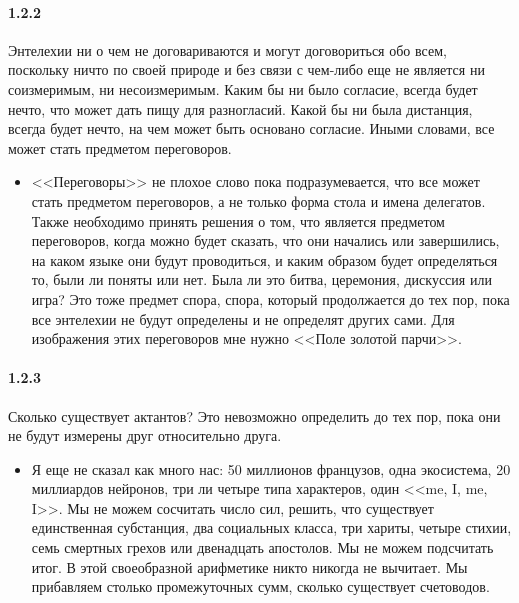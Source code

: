 
\paragraph{1.2.2}\hypertarget{par:1.2.2}{} Энтелехии ни о чем не договариваются и могут договориться обо всем, поскольку ничто по своей природе и без связи с чем-либо еще не является ни соизмеримым, ни несоизмеримым. Каким бы ни было согласие, всегда будет нечто, что может дать пищу для разногласий. Какой бы ни была дистанция, всегда будет нечто, на чем может быть основано согласие. Иными словами, все может стать предметом переговоров.
	\begin{itemize}
	\item <<Переговоры>> не плохое слово пока подразумевается, что все может стать предметом переговоров, а не только форма стола и имена делегатов. Также необходимо принять решения о том, что является предметом переговоров, когда можно будет сказать, что они начались или завершились, на каком языке они будут проводиться, и каким образом будет определяться то, были ли поняты или нет. Была ли это битва, церемония, дискуссия или игра? Это тоже предмет спора, спора, который продолжается до тех пор, пока все энтелехии не будут определены и не определят других сами. Для изображения этих переговоров мне нужно <<Поле золотой парчи>>.
	\end{itemize}

\paragraph{1.2.3}\hypertarget{par:1.2.3}{} Сколько существует актантов? Это невозможно определить до тех пор, пока они не будут измерены друг относительно друга.
	\begin{itemize}
	\item Я еще не сказал как много нас: 50 миллионов французов, одна экосистема, 20 миллиардов нейронов, три ли четыре типа характеров, один <<me, I, me, I>>. Мы не можем сосчитать число сил, решить, что существует единственная субстанция, два социальных класса, три хариты, четыре стихии, семь смертных грехов или двенадцать апостолов. Мы не можем подсчитать итог. В этой своеобразной арифметике никто никогда не вычитает. Мы прибавляем столько промежуточных сумм, сколько существует счетоводов.
	\end{itemize}


